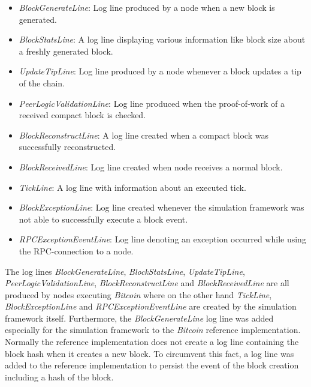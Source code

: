\begin{itemize}
   \item \textit{BlockGenerateLine}: Log line produced by a node when a new block is generated.
   \item \textit{BlockStatsLine}: A log line displaying various information like block size about a freshly generated block.
   \item \textit{UpdateTipLine}: Log line produced by a node whenever a block updates a tip of the chain.
   \item \textit{PeerLogicValidationLine}: Log line produced when the proof-of-work of a received compact block is checked.  
   \item \textit{BlockReconstructLine}: A log line created when a compact block was successfully reconstructed.
   \item \textit{BlockReceivedLine}: Log line created when node receives a normal block.
   \item \textit{TickLine}: A log line with information about an executed tick.
   \item \textit{BlockExceptionLine}: Log line created whenever the simulation framework was not able to successfully execute a block event.
   \item \textit{RPCExceptionEventLine}: Log line denoting an exception occurred while using the RPC-connection to a node.
\end{itemize}

The log lines \textit{BlockGenerateLine}, \textit{BlockStatsLine}, \textit{UpdateTipLine}, \textit{PeerLogicValidationLine}, \textit{BlockReconstructLine} and \textit{BlockReceivedLine} are all produced by nodes executing \textit{Bitcoin} where on the other hand \textit{TickLine}, \textit{BlockExceptionLine} and \textit{RPCExceptionEventLine} are created by the simulation framework itself.
Furthermore, the \textit{BlockGenerateLine} log line was added especially for the simulation framework to the \textit{Bitcoin} reference implementation.
Normally the reference implementation does not create a log line containing the block hash when it creates a new block.
To circumvent this fact, a log line was added to the reference implementation to persist the event of the block creation including a hash of the block.

